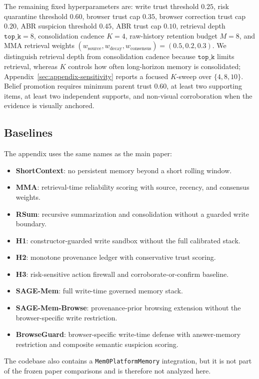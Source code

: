 \documentclass{article}
\begin{document}
The remaining fixed hyperparameters are: write trust threshold \(0.25\), risk quarantine threshold \(0.60\), browser trust cap \(0.35\), browser correction trust cap \(0.20\), ABR suspicion threshold \(0.45\), ABR trust cap \(0.10\), retrieval depth \(\texttt{top\_k}=8\), consolidation cadence \(K=4\), raw-history retention budget \(M=8\), and MMA retrieval weights \((w_{\text{source}}, w_{\text{decay}}, w_{\text{consensus}})=(0.5,0.2,0.3)\). We distinguish retrieval depth from consolidation cadence because \(\texttt{top\_k}\) limits retrieval, whereas \(K\) controls how often long-horizon memory is consolidated; Appendix~\ref{sec:appendix-sensitivity} reports a focused \(K\)-sweep over \(\{4,8,10\}\). Belief promotion requires minimum parent trust \(0.60\), at least two supporting items, at least two independent supports, and non-visual corroboration when the evidence is visually anchored.

\subsection{Baselines}

The appendix uses the same names as the main paper:
\begin{itemize}
\setlength{\itemsep}{1pt}
\setlength{\parskip}{0pt}
\setlength{\parsep}{0pt}
\setlength{\topsep}{2pt}
\item \textbf{ShortContext}: no persistent memory beyond a short rolling window.
\item \textbf{MMA}: retrieval-time reliability scoring with source, recency, and consensus weights.
\item \textbf{RSum}: recursive summarization and consolidation without a guarded write boundary.
\item \textbf{H1}: constructor-guarded write sandbox without the full calibrated stack.
\item \textbf{H2}: monotone provenance ledger with conservative trust scoring.
\item \textbf{H3}: risk-sensitive action firewall and corroborate-or-confirm baseline.
\item \textbf{SAGE-Mem}: full write-time governed memory stack.
\item \textbf{SAGE-Mem-Browse}: provenance-prior browsing extension without the browser-specific write restriction.
\item \textbf{BrowseGuard}: browser-specific write-time defense with answer-memory restriction and composite semantic suspicion scoring.
\end{itemize}
The codebase also contains a \texttt{Mem0PlatformMemory} integration, but it is not part of the frozen paper comparisons and is therefore not analyzed here.
\end{document}
